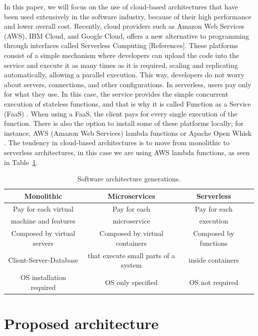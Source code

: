 \documentclass[runningheads]{llncs}
\begin{document}
In this paper, we will focus on the use of cloud-based architectures that have
been used extensively in the software industry, because of their high
performance and lower overall cost. Recently, cloud providers such as Amazon Web
Services (AWS), IBM Cloud, and Google Cloud, offers a new alternative to
programming through interfaces called Serverless Computing [References]. These
platforms consist of a simple mechanism where developers can upload the code
into the service and execute it as many times as it is required, scaling and
replicating automatically, allowing a parallel execution. This way, developers
do not worry about servers, connections, and other configurations. In
serverless, users pay only for what they use. In this case, the service provides
the simple concurrent execution of stateless functions, and that is why it is
called Function as a Service (FaaS) \cite{Hellerstein2018,Baird2016}
. When using a FaaS, the client pays for every single execution of the function.
There is also the option to install some of these platforms locally; for
instance, AWS (Amazon Web Services) lambda functions \cite{Baird2016} or Apache Open Whisk
\cite{Guerv2018}. The tendency in cloud-based architectures is to move from 
monolithic to serverless architectures, in this case we are using AWS lambda
functions, as seen in Table~\ref{table:architectures}.     

\begin{table}[htp]
  \caption{Software architecture generations.}
  \label{table:architectures}
  \centering
  \begin{tabular}{|c|c|c|c|}
  \hline
  Monolithic & Microservices & Serverless \\
  \hline
  Pay for each virtual  & Pay for each  & Pay for each \\
  machine and features  & microservice  & execution \\
  \hline
  Composed by virtual servers  & Composed by virtual containers & Composed by functions \\
  Client-Server-Database & that execute small parts of a system & inside containers \\
  \hline
  OS installation required & OS only specified & OS not required\\
  \hline
  \end{tabular}
  \end{table}


\section{Proposed architecture}
\label{sec:architecture}
\end{document}
